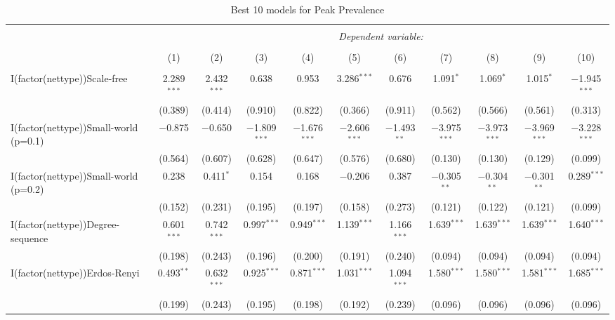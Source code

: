 
\begin{table}[!htbp] \centering 
  \caption{Best 10 models for Peak Prevalence} 
  \label{tab:best_models_peak_preval} 
\begin{tabular}{@{\extracolsep{5pt}}lcccccccccc} 
\\[-1.8ex]\hline 
\hline \\[-1.8ex] 
 & \multicolumn{10}{c}{\textit{Dependent variable:}} \\ 
\cline{2-11} 
\\[-1.8ex] & (1) & (2) & (3) & (4) & (5) & (6) & (7) & (8) & (9) & (10)\\ 
\hline \\[-1.8ex] 
 I(factor(nettype))Scale-free & 2.289$^{***}$ & 2.432$^{***}$ & 0.638 & 0.953 & 3.286$^{***}$ & 0.676 & 1.091$^{*}$ & 1.069$^{*}$ & 1.015$^{*}$ & $-$1.945$^{***}$ \\ 
  & (0.389) & (0.414) & (0.910) & (0.822) & (0.366) & (0.911) & (0.562) & (0.566) & (0.561) & (0.313) \\ 
  I(factor(nettype))Small-world (p=0.1) & $-$0.875 & $-$0.650 & $-$1.809$^{***}$ & $-$1.676$^{***}$ & $-$2.606$^{***}$ & $-$1.493$^{**}$ & $-$3.975$^{***}$ & $-$3.973$^{***}$ & $-$3.969$^{***}$ & $-$3.228$^{***}$ \\ 
  & (0.564) & (0.607) & (0.628) & (0.647) & (0.576) & (0.680) & (0.130) & (0.130) & (0.129) & (0.099) \\ 
  I(factor(nettype))Small-world (p=0.2) & 0.238 & 0.411$^{*}$ & 0.154 & 0.168 & $-$0.206 & 0.387 & $-$0.305$^{**}$ & $-$0.304$^{**}$ & $-$0.301$^{**}$ & 0.289$^{***}$ \\ 
  & (0.152) & (0.231) & (0.195) & (0.197) & (0.158) & (0.273) & (0.121) & (0.122) & (0.121) & (0.099) \\ 
  I(factor(nettype))Degree-sequence & 0.601$^{***}$ & 0.742$^{***}$ & 0.997$^{***}$ & 0.949$^{***}$ & 1.139$^{***}$ & 1.166$^{***}$ & 1.639$^{***}$ & 1.639$^{***}$ & 1.639$^{***}$ & 1.640$^{***}$ \\ 
  & (0.198) & (0.243) & (0.196) & (0.200) & (0.191) & (0.240) & (0.094) & (0.094) & (0.094) & (0.094) \\ 
  I(factor(nettype))Erdos-Renyi & 0.493$^{**}$ & 0.632$^{***}$ & 0.925$^{***}$ & 0.871$^{***}$ & 1.031$^{***}$ & 1.094$^{***}$ & 1.580$^{***}$ & 1.580$^{***}$ & 1.581$^{***}$ & 1.685$^{***}$ \\ 
  & (0.199) & (0.243) & (0.195) & (0.198) & (0.192) & (0.239) & (0.096) & (0.096) & (0.096) & (0.096) \\ 

\end{tabular}
\end{table}
